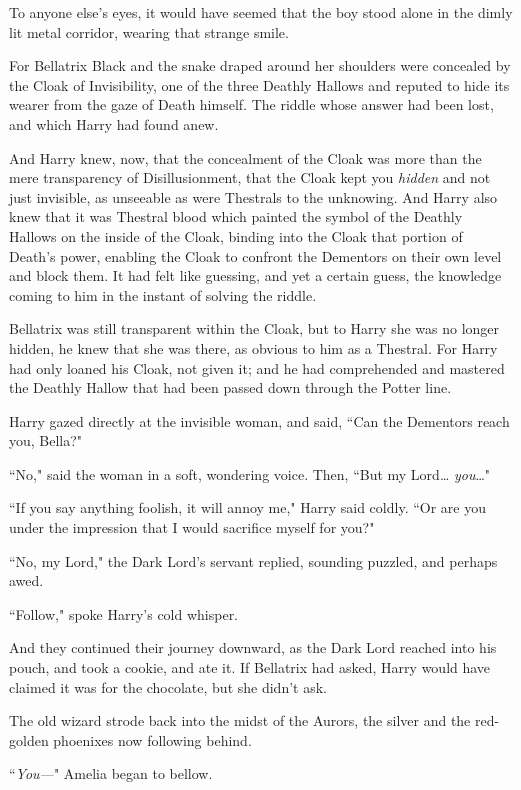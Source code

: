 To anyone else's eyes, it would have seemed that the boy stood alone in the dimly lit metal corridor, wearing that strange smile.

For Bellatrix Black and the snake draped around her shoulders were concealed by the Cloak of Invisibility, one of the three Deathly Hallows and reputed to hide its wearer from the gaze of Death himself. The riddle whose answer had been lost, and which Harry had found anew.

And Harry knew, now, that the concealment of the Cloak was more than the mere transparency of Disillusionment, that the Cloak kept you \emph{hidden} and not just invisible, as unseeable as were Thestrals to the unknowing. And Harry also knew that it was Thestral blood which painted the symbol of the Deathly Hallows on the inside of the Cloak, binding into the Cloak that portion of Death's power, enabling the Cloak to confront the Dementors on their own level and block them. It had felt like guessing, and yet a certain guess, the knowledge coming to him in the instant of solving the riddle.

Bellatrix was still transparent within the Cloak, but to Harry she was no longer hidden, he knew that she was there, as obvious to him as a Thestral. For Harry had only loaned his Cloak, not given it; and he had comprehended and mastered the Deathly Hallow that had been passed down through the Potter line.

Harry gazed directly at the invisible woman, and said, ``Can the Dementors reach you, Bella?"

``No," said the woman in a soft, wondering voice. Then, ``But my Lord{\ldots} \emph{you}{\ldots}"

``If you say anything foolish, it will annoy me," Harry said coldly. ``Or are you under the impression that I would sacrifice myself for you?"

``No, my Lord," the Dark Lord's servant replied, sounding puzzled, and perhaps awed.

``Follow," spoke Harry's cold whisper.

And they continued their journey downward, as the Dark Lord reached into his pouch, and took a cookie, and ate it. If Bellatrix had asked, Harry would have claimed it was for the chocolate, but she didn't ask.

\later

The old wizard strode back into the midst of the Aurors, the silver and the red-golden phoenixes now following behind.

``\emph{You---}" Amelia began to bellow.

